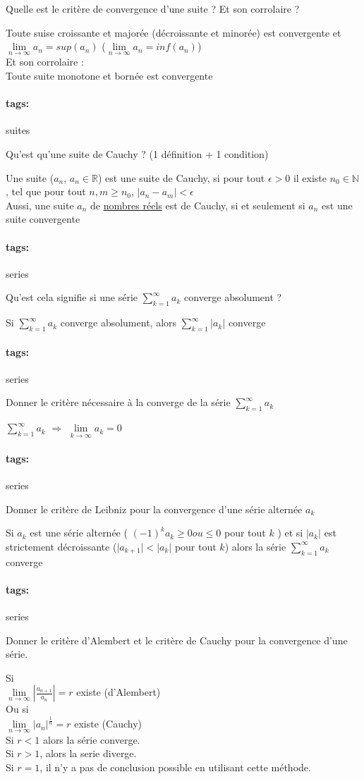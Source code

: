 \documentclass[12pt]{article}
\newcommand*{\xfield}[1]{\begin{mdframed}\centering #1\end{mdframed}\bigskip}
\newenvironment{note}{}{}
\newcommand*{\tags}[1]{\paragraph{tags: }#1}
\begin{document}
\begin{note}
    \xfield{Quelle est le critère de convergence d'une suite ? Et son corrolaire ?}
    \xfield{
        Toute suise croissante et majorée (décroissante et minorée) est convergente et $\lim\limits_{n \to \infty} a_n = sup(a_n)$ ($\lim\limits_{n \to \infty} a_n = inf(a_n)$) \\
        Et son corrolaire : \\
        Toute suite monotone et bornée est convergente
    }
\end{note}

\begin{note}
	\tags{suites}
    \xfield{Qu'est qu'une suite de Cauchy ? (1 définition + 1 condition)}
    \xfield{
        Une suite ($a_n$, $a_n \in \mathbb{R}$) est une suite de Cauchy, si pour tout $\epsilon > 0$ il existe $n_0 \in \mathbb{N}$, tel que pour tout $n,m \ge n_0$, $ | a_n - a_m | < \epsilon$\\
        Aussi, une suite $a_n$ de \underline{nombres réels} est de Cauchy, si et seulement si $a_n$ est une suite convergente
    }
\end{note}

\begin{note}
	\tags{series}
	\xfield{Qu'est cela signifie si une série $\sum\limits^{\infty}_{k=1} a_k$ converge absolument ?}
	\xfield{Si $\sum\limits^{\infty}_{k=1} a_k$ converge absolument, alors $\sum\limits^{\infty}_{k=1} \vert a_k\vert$ converge }
\end{note}

\begin{note}
	\tags{series}
	\xfield{Donner le critère nécessaire à la converge de la série $\sum\limits^{\infty}_{k=1} a_k$}
	\xfield{$\sum\limits^{\infty}_{k=1} a_k$ $\Rightarrow$ $\lim\limits_{k\to \infty}a_k = 0$}
\end{note}

\begin{note}
	\tags{series}
	\xfield{Donner le critère de Leibniz pour la convergence d'une série alternée $a_k$}
	\xfield{Si $a_k$ est une série alternée ( $(-1)^k a_k \ge 0 ou \le 0$ pour tout $k$ ) et si $\vert a_k \vert$ est strictement décroissante ($\vert a_{k+1} \vert < \vert a_k \vert$ pour tout $k$) alors la série $\sum\limits^{\infty}_{k=1} a_k$ converge}
\end{note}

\begin{note}
	\tags{series}
    \xfield{Donner le critère d'Alembert et le critère de Cauchy pour la convergence d'une série.}
    \xfield{
        Si\\
        $\lim\limits_{n \to \infty} \left|\frac{a_{n+1}}{a_n}\right| = r$ existe (d'Alembert)\\
        Ou si\\
        $\lim\limits_{n \to \infty} \left|a_n\right|^{\frac{1}{n}} = r$ existe (Cauchy)\\
        Si $r < 1$ alors la série converge.\\
	Si $r > 1$, alors la serie diverge.\\
	Si $r = 1$, il n'y a pas de conclusion possible en utilisant cette méthode.
    }
\end{note}
\end{document}
